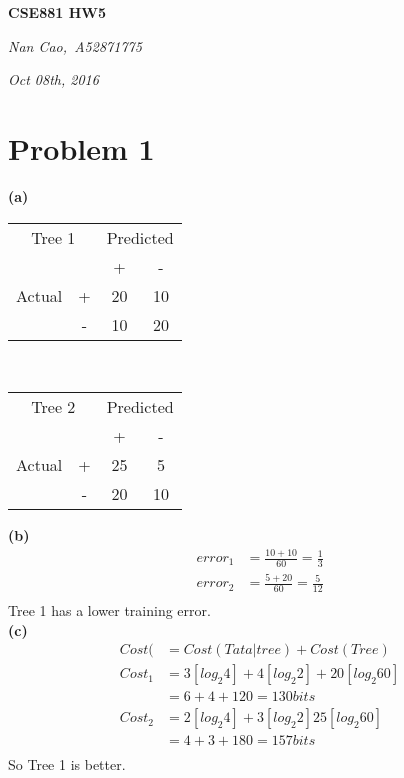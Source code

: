 \documentclass[11pt]{scrartcl}
\begin{document}
\centerline{\LARGE{\textbf{CSE881 HW5}}}
\centerline{\large{\textit{Nan Cao,\  A52871775}}}
\centerline{\large{\textit{Oct 08th, 2016}}}
\section*{Problem 1}
\textbf{(a)}
\begin{center}
\begin{tabular}{|c|c|c|c|}
	\hline
 \multicolumn{2}{|c|}{Tree 1}
 &\multicolumn{2}{|c|}{Predicted}\\
 \cline{3-4}
 \multicolumn{2}{|c|}{}& +  & -  \\
 \cline{1-4}
	Actual & +         & 20 & 10 \\
 \cline{2-4}
	       & -         & 10 & 20\\
 \hline
\end{tabular}
\ \ \ \ \ \ \ \ \ \ \ \ \ \ \ 
\begin{tabular}{|c|c|c|c|}
 \hline
 \multicolumn{2}{|c|}{Tree 2}
&\multicolumn{2}{|c|}{Predicted}\\
 \cline{3-4}
 \multicolumn{2}{|c|}{}& +  & -  \\
 \cline{1-4}
		        Actual & +  & 25 & 5 \\
 \cline{2-4}
		               & -  & 20 & 10  \\
 \hline
\end{tabular}
\end{center}
\textbf{(b)}
\begin{equation*}
\begin{aligned}
error_1&=\frac{10+10}{60}=\frac{1}{3}\\
error_2&=\frac{5+20}{60}=\frac{5}{12}\\
\end{aligned}
\end{equation*}
Tree 1 has a lower training error.\\
\textbf{(c)}
\begin{equation*}
\begin{aligned}
Cost(
&= Cost(Tata|tree)+Cost(Tree)\\
Cost_1&=3[log_{2}4]+4[log_{2}2]+20[log_{2}60]\\
&=6+4+120=130bits\\
Cost_2&=2[log_{2}4]+3[log_{2}2]25[log_{2}60]\\
&=4+3+180=157bits\\
\end{aligned}
\end{equation*}
So Tree 1 is better.\\
\end{document}
